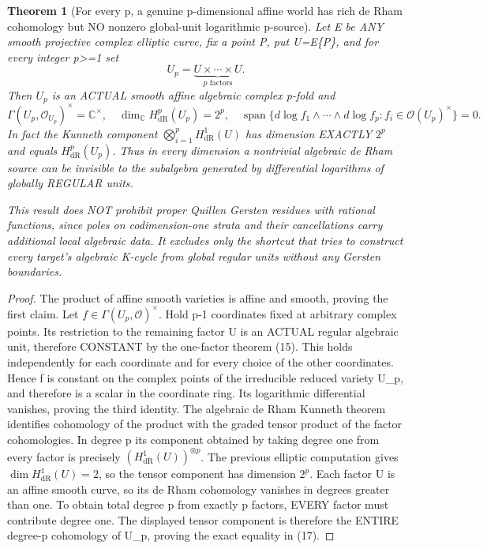 \documentclass[11pt]{article}
\newtheorem{theorem}{Theorem}[section]
\begin{document}
\begin{theorem}[For every p, a genuine p-dimensional affine world has rich de Rham cohomology but NO nonzero global-unit logarithmic p-source]
Let E be ANY smooth projective complex elliptic
curve, fix a point P, put U=E\setminus\{P\},
and for every integer p>=1 set
\[
 \boxed{U_p=\underbrace{U\times\cdots\times U}_{p\text{ factors}}.}
                                                               \tag{16}
\]
Then $U_p$ is an ACTUAL smooth affine algebraic
complex p-fold and
\[
 \boxed{
 \Gamma(U_p,\mathcal O_{U_p})^\times=\mathbb C^\times,
 \quad
 \dim_{\mathbb C}H_{\mathrm{dR}}^p(U_p)=2^p,
 \quad
 \operatorname{span}\{
 d\log f_1\wedge\cdots\wedge d\log f_p:
     f_i\in\mathcal O(U_p)^\times\}=0.
 }                                                     \tag{17}
\]
In fact the Kunneth component
$\bigotimes_{i=1}^p H_{\mathrm{dR}}^1(U)$
has dimension EXACTLY $2^p$
and equals $H_{\mathrm{dR}}^p(U_p)$.
Thus in every dimension a nontrivial
algebraic de Rham source can be invisible to
the subalgebra generated by differential
logarithms of globally REGULAR units.

This result does NOT prohibit proper
Quillen Gersten residues with rational
functions, since poles on codimension-one
strata and their cancellations carry
additional local algebraic data.
It excludes only the shortcut that tries to
construct every target's algebraic K-cycle
from global regular units without any
Gersten boundaries.
\end{theorem}
\begin{proof}
The product of affine smooth varieties is
affine and smooth, proving the first claim.
Let $f\in\Gamma(U_p,\mathcal O)^\times$.
Hold p-1 coordinates fixed at arbitrary
complex points. Its restriction to the
remaining factor U is an ACTUAL regular
algebraic unit, therefore CONSTANT by
the one-factor theorem (15). This holds
independently for each coordinate and for
every choice of the other coordinates.
Hence f is constant on the complex points
of the irreducible reduced variety U_p,
and therefore is a scalar in the coordinate
ring. Its logarithmic differential vanishes,
proving the third identity.
The algebraic de Rham Kunneth theorem
identifies cohomology of the product with
the graded tensor product of the
factor cohomologies. In degree p its
component obtained by taking degree one
from every factor is precisely
$(H^1_{\mathrm{dR}}(U))^{\otimes p}$.
The previous elliptic computation gives
$\dim H^1_{\mathrm{dR}}(U)=2$, so the
tensor component has dimension $2^p$.
Each factor U is an affine smooth curve,
so its de Rham cohomology vanishes in
degrees greater than one. To obtain total
degree p from exactly p factors, EVERY
factor must contribute degree one.
The displayed tensor component is therefore
the ENTIRE degree-p cohomology of U_p,
proving the exact equality in (17).
\end{proof}
\end{document}
